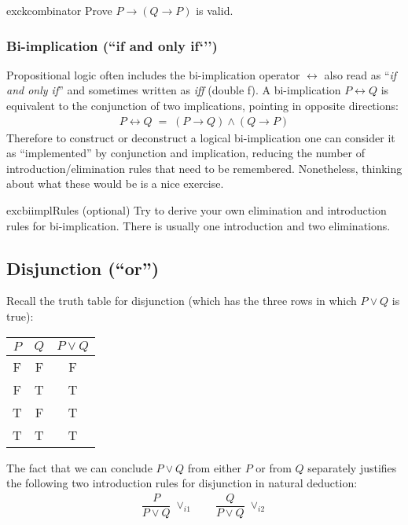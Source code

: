 \documentclass{article}
\theoremstyle{definition}
\begin{document}
\begin{restatable}{exc}{kcombinator}
Prove $P \rightarrow (Q \rightarrow P)$ is valid.
\end{restatable}

\subsubsection{Bi-implication  (``if and only if`'')}

Propositional logic often includes the bi-implication operator
$\leftrightarrow$ also read as ``\emph{if and only if}'' and sometimes
written as \emph{iff} (double f). A bi-implication $P \leftrightarrow Q$ is
equivalent to the conjunction of two implications, pointing in
opposite directions:
% 
\begin{align*}
P \leftrightarrow Q \; = \; (P \rightarrow Q) \wedge (Q \rightarrow P)
\end{align*}
%
Therefore to construct or deconstruct a logical
bi-implication one can consider it as ``implemented'' by
conjunction and implication, reducing the number of
introduction/elimination rules that need to be
remembered. Nonetheless, thinking about what these would be
is a nice exercise.

\begin{restatable}{exc}{biimplRules} (optional)
Try to derive your own elimination and introduction rules for
bi-implication. There is usually one introduction and two eliminations.
\end{restatable}



\subsection{Disjunction (``or'')}

Recall the truth table for disjunction (which has the three rows
in which $P \vee Q$ is true):
%
\begin{center}
\begin{tabular}{cc|c}
  $P$ & $Q$ & $P \vee Q$ \\ \hline
  F & F & F \\
\rowcolor{yellow} F & T & T \\
\rowcolor{yellow}  T & F & T \\
\rowcolor{yellow}  T & T & T
\end{tabular}
\end{center}
%
The fact that we can conclude $P \vee Q$ from either $P$
or from $Q$ separately justifies the following two introduction
rules for disjunction in natural deduction:
%
\begin{align*}
  \dfrac{P}
  {P \vee Q} \; {\vee_{i1}}
  \qquad
    \dfrac{Q}
  {P \vee Q} \; {\vee_{i2}}
\end{align*}
%
\end{document}
